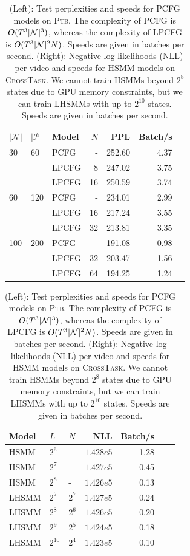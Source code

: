 \documentclass{article}
\begin{document}
\begin{table}[!t]
\centering
\begin{tabular} {lllrrrr}
\toprule
$|\mathcal{N}|$ & $|\mathcal{P}|$ & Model & $N$ &  PPL & Batch/s\\
\midrule
30  & 60    & PCFG & - & 252.60 & 4.37\\
    &       & LPCFG & 8 &  247.02    & 3.75\\
    &       & LPCFG & 16 & 250.59    & 3.74\\
\midrule
60  & 120   & PCFG & - & 234.01 & 2.99\\
    &       & LPCFG & 16& 217.24 & 3.55\\
    &       & LPCFG & 32& 213.81 & 3.35\\
\midrule
100 & 200   & PCFG & - &  191.08   & 0.98\\
    &       & LPCFG & 32& 203.47 & 1.56\\
    &       & LPCFG & 64& 194.25 & 1.24\\
\bottomrule
\end{tabular}
\vspace{0em}
\hfill
\begin{tabular} {lllrrrr}
\toprule
Model & $L$ & $N$ & NLL & Batch/s \\
\midrule
HSMM & $2^6$ & - & $1.428e5$ & 1.28 \\
HSMM & $2^7$ & - & $1.427e5$  & 0.45\\
HSMM & $2^8$ & - & $1.426e5$ & 0.13 \\
\midrule
LHSMM & $2^7$ & $2^7$ & $1.427e5$ & 0.24 \\
LHSMM & $2^8$ & $2^6$ & $1.426e5$ & 0.20 \\
LHSMM & $2^9$ & $2^5$ & $1.424e5$ & 0.18 \\
LHSMM & $2^{10}$ & $2^4$ & $1.423e5$ & 0.10 \\
\bottomrule
\end{tabular}
\vspace{.5em}
\caption{\label{tbl:cky}
(Left): Test perplexities and speeds for PCFG models on \textsc{Ptb}. The complexity of PCFG is $O(T^3|\mathcal{N}|^3)$, whereas the complexity of LPCFG is $O(T^3 |\mathcal{N}|^2N)$. Speeds are given in batches per second. (Right): Negative log likelihoods (NLL) per video and speeds for HSMM models on \textsc{CrossTask}. We cannot train HSMMs beyond $2^8$ states due to GPU memory constraints, but we can train LHSMMs with up to $2^{10}$ states. Speeds are given in batches per second.
}
\end{table}
\end{document}
